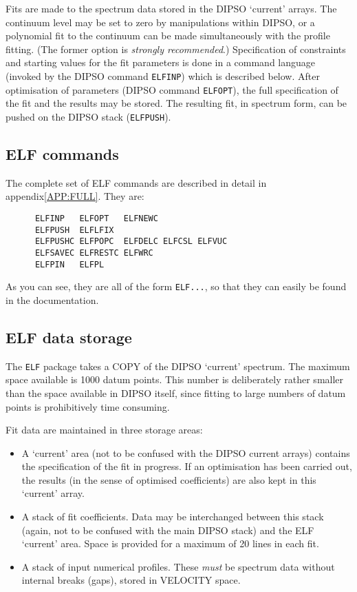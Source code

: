 \documentclass[twoside,11pt]{article}
\newcommand{\hyperref}[4]{#2\ref{#4}#3}
\newcommand{\htmlref}[2]{#1}
\renewcommand{\_}{\texttt{\symbol{95}}}
\begin{document}
Fits are made to the spectrum data stored in the DIPSO `current'
arrays. The continuum level may be set to zero by manipulations within
DIPSO, or a polynomial fit to the continuum can be made simultaneously
with the profile fitting. (The former option is {\em strongly
recommended}.) Specification of constraints and starting values for
the fit parameters is done in a command language (invoked by the DIPSO
command \htmlref{{\tt{ELFINP}}}{COM:ELFINP})  which is described below. After optimisation of
parameters (DIPSO command \htmlref{{\tt{ELFOPT}}}{COM:ELFOPT}),  the full specification of the
fit and the results may be stored. The resulting fit, in spectrum
form, can be pushed on the DIPSO stack (\htmlref{{\tt{ELFPUSH}}}{COM:ELFPUSH}). 

\subsection {ELF commands}

The complete set of ELF commands are described in detail
\hyperref{below}{in appendix}{}{APP:FULL}. They are:

\begin{verbatim}
      ELFINP   ELFOPT   ELFNEWC
      ELFPUSH  ELFLFIX
      ELFPUSHC ELFPOPC  ELFDELC ELFCSL ELFVUC
      ELFSAVEC ELFRESTC ELFWRC
      ELFPIN   ELFPL
\end{verbatim}

As you can see, they are all of the form {\tt{ELF...}},  so that they can
easily be found in the documentation.

\subsection {ELF data storage}

The {\tt{ELF}}  package takes a COPY of the DIPSO `current' spectrum.
The maximum space available is 1000 datum points.
This number is deliberately rather smaller than the space available in DIPSO
itself, since fitting to large numbers of datum points is prohibitively time
consuming.

Fit data are maintained in three storage areas:

\begin{itemize}

\item A `current' area (not to be confused with the DIPSO current
arrays) contains the specification of the fit in progress. If an
optimisation has been carried out, the results (in the sense of
optimised coefficients) are also kept in this `current' array.

\item A stack of fit coefficients. Data may be interchanged between
this stack (again, not to be confused with the main DIPSO stack) and
the ELF `current' area. Space is provided for a maximum of 20 lines in
each fit.

\item A stack of input numerical profiles. These {\em must} be
spectrum data without internal breaks (gaps), stored in VELOCITY
space.

\end{itemize}
\end{document}
